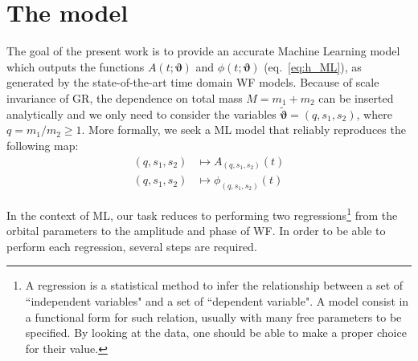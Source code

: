 \section{The model }
\label{sec:model}
%
The goal of the present work is to provide an accurate Machine Learning model which outputs the functions $A(t;\boldsymbol{\vartheta})$ and $\phi(t;\boldsymbol{\vartheta})$ (eq.~\eqref{eq:h_ML}), as generated by the state-of-the-art time domain WF models.
Because of scale invariance of GR, the dependence on total mass $M= m_1+m_2$ can be inserted analytically \cite{Arbey2019scaling} and we only need to consider the variables $\tilde{\boldsymbol{\vartheta}} = (q, s_1, s_2)$, where $q= m_1/m_2 \geq 1$.
More formally, we seek a ML model that reliably reproduces the following map:
\begin{align}
	(q, s_1, s_2) &\longmapsto A_{(q, s_1, s_2)}(t) \label{eq:objective_amp}\\
	(q, s_1, s_2) &\longmapsto \phi_{(q, s_1, s_2)}(t) \label{eq:objective_ph}
\end{align}
\BS{[ma anche no]}

\par
In the context of ML, our task reduces to performing two regressions\footnote{A regression is a statistical method to infer the relationship between a set of ``independent variables" and a set of ``dependent variable". A model consist in a functional form for such relation, usually with many free parameters to be specified. By looking at the data, one should be able to make a proper choice for their value.} 
from the orbital parameters
%
%
to the amplitude and phase of WF. 
In order to be able to perform each regression, several steps are required.

